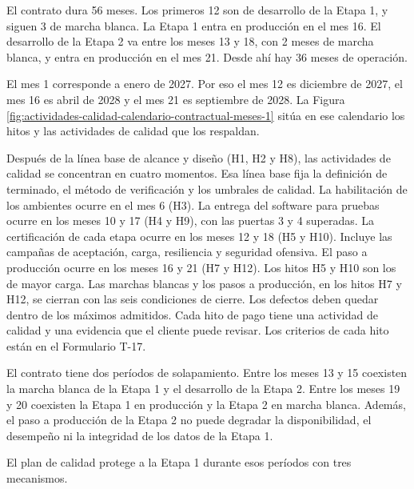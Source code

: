 \documentclass[subdoc]{../../comun/overfore}
\begin{document}
El contrato dura 56 meses. Los primeros 12 son de desarrollo de la Etapa 1, y siguen 3 de marcha blanca. La Etapa 1 entra en producción en el mes 16. El desarrollo de la Etapa 2 va entre los meses 13 y 18, con 2 meses de marcha blanca, y entra en producción en el mes 21. Desde ahí hay 36 meses de operación.

El mes 1 corresponde a enero de 2027. Por eso el mes 12 es diciembre de 2027, el mes 16 es abril de 2028 y el mes 21 es septiembre de 2028. La Figura \ref{fig:actividades-calidad-calendario-contractual-meses-1} sitúa en ese calendario los hitos y las actividades de calidad que los respaldan.

Después de la línea base de alcance y diseño (H1, H2 y H8), las actividades de calidad se concentran en cuatro momentos. Esa línea base fija la definición de terminado, el método de verificación y los umbrales de calidad. La habilitación de los ambientes ocurre en el mes 6 (H3). La entrega del software para pruebas ocurre en los meses 10 y 17 (H4 y H9), con las puertas 3 y 4 superadas. La certificación de cada etapa ocurre en los meses 12 y 18 (H5 y H10). Incluye las campañas de aceptación, carga, resiliencia y seguridad ofensiva. El paso a producción ocurre en los meses 16 y 21 (H7 y H12). Los hitos H5 y H10 son los de mayor carga. Las marchas blancas y los pasos a producción, en los hitos H7 y H12, se cierran con las seis condiciones de cierre. Los defectos deben quedar dentro de los máximos admitidos. Cada hito de pago tiene una actividad de calidad y una evidencia que el cliente puede revisar. Los criterios de cada hito están en el Formulario T-17.

El contrato tiene dos períodos de solapamiento. Entre los meses 13 y 15 coexisten la marcha blanca de la Etapa 1 y el desarrollo de la Etapa 2. Entre los meses 19 y 20 coexisten la Etapa 1 en producción y la Etapa 2 en marcha blanca. Además, el paso a producción de la Etapa 2 no puede degradar la disponibilidad, el desempeño ni la integridad de los datos de la Etapa 1.

El plan de calidad protege a la Etapa 1 durante esos períodos con tres mecanismos.
\end{document}
